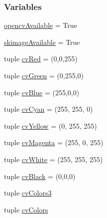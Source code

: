 \subsubsection*{Variables}
\begin{DoxyCompactItemize}
\item 
\hyperlink{namespacecvutils_a94a896f31d72456ff2ab729d96a8df40}{opencv\-Available} = True
\item 
\hyperlink{namespacecvutils_aae348a91b1bd2ba179f686460c246276}{skimage\-Available} = True
\item 
tuple \hyperlink{namespacecvutils_a680f1b0a03a6462731fa4ac22367ed73}{cv\-Red} = (0,0,255)
\item 
tuple \hyperlink{namespacecvutils_ae39ef1684493f0a0a2e4d59327f47f4a}{cv\-Green} = (0,255,0)
\item 
tuple \hyperlink{namespacecvutils_a21f2d3986a080f8ffba966c404883ec3}{cv\-Blue} = (255,0,0)
\item 
tuple \hyperlink{namespacecvutils_afe0bcde1ac3ab3490dae779d6b79fad3}{cv\-Cyan} = (255, 255, 0)
\item 
tuple \hyperlink{namespacecvutils_a86df70c7211dfd80fca1ef6856a498ec}{cv\-Yellow} = (0, 255, 255)
\item 
tuple \hyperlink{namespacecvutils_a1e82f749ec369c57da7e9970744e428c}{cv\-Magenta} = (255, 0, 255)
\item 
tuple \hyperlink{namespacecvutils_a4d090f01341871da396b52ebff502d2c}{cv\-White} = (255, 255, 255)
\item 
tuple \hyperlink{namespacecvutils_a43328b65912125accda8093b36b70c4c}{cv\-Black} = (0,0,0)
\item 
tuple \hyperlink{namespacecvutils_a29efe4a75fb1c40988443f215647998f}{cv\-Colors3}
\item 
tuple \hyperlink{namespacecvutils_aaab6eff7b41ecfffa29df473eaef1745}{cv\-Colors}
\end{DoxyCompactItemize}


